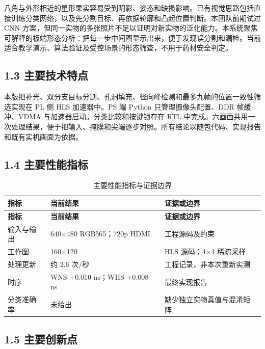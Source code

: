 \documentclass[UTF8,fontset=windows,a4paper,11pt]{ctexart}
\begin{document}
八角与外形相近的星形果实容易受到阴影、姿态和缺损影响。已有视觉思路包括直接训练分类网络，以及先分割目标、再依据轮廓和凸起位置判断。本团队前期试过 CNN 方案，但同一实物的多张照片不足以证明对新实物的泛化能力。本系统聚焦可解释的板端形态分析：把每一步中间图显示出来，便于发现误分割和漏检。当前适合教学演示、算法验证及受控场景的形态筛查，不用于药材安全判定。\par

\subsection*{1.3 主要技术特点}

本版把补光、双分支目标分割、孔洞填充、径向峰检测和最多九帧的位置一致性筛选实现在 PL 侧 HLS 加速器中。PS 端 Python 只管理摄像头配置、DDR 帧缓冲、VDMA 与加速器启动。分类比较和按键锁存在 RTL 中完成。六画面共用一次处理结果，便于把输入、掩膜和尖端逐步对照。所有结论以随包代码、实现报告和既有实机画面为依据。\par

\subsection*{1.4 主要性能指标}

\begin{center}
\begingroup
\fontsize{8.5}{11}\selectfont
\setlength{\tabcolsep}{3pt}
\renewcommand{\arraystretch}{1.22}
\begin{longtable}{@{}p{3.024cm}p{4.158cm}p{6.617cm}@{}}
\caption{主要性能指标与证据边界}\\
\toprule
\textbf{指标} & \textbf{当前结果} & \textbf{证据或边界} \\
\midrule
\endfirsthead
\toprule
\textbf{指标} & \textbf{当前结果} & \textbf{证据或边界} \\
\midrule
\endhead
\bottomrule
\endfoot
输入与输出 & 640×480 RGB565；720p HDMI & 工程源码及约束 \\
工作图 & 160×120 & HLS 源码；4×4 稀疏采样 \\
处理更新 & 约 2.6 次/秒 & 工程记录，非本次重新实测 \\
时序 & WNS +0.010 ns；WHS +0.008 ns & 最终实现报告 \\
分类准确率 & 未给出 & 缺少独立实物真值与混淆矩阵 \\
\end{longtable}
\endgroup
\end{center}

\subsection*{1.5 主要创新点}
\end{document}
